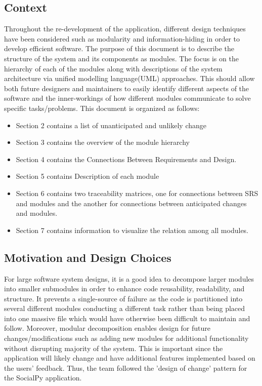 \documentclass[12pt, titlepage]{article}
\begin{document}
\subsection{Context}
Throughout the re-development of the application, different design techniques have been considered such as modularity and information-hiding in order to develop efficient software. The purpose of this document is to describe the structure of the system and its components as modules. The focus is on the hierarchy of each of the modules along with descriptions of the system architecture via unified modelling language(UML) approaches. This should allow both future designers and maintainers to easily identify different aspects of the software and the inner-workings of how different modules communicate to solve specific tasks/problems. This document is organized as follows:
\begin{itemize}
    \item Section 2 contains a list of unanticipated and unlikely change
    \item Section 3 contains the overview of the module hierarchy
    \item Section 4 contains the Connections Between Requirements and Design.
    \item Section 5 contains Description of each module
    \item Section 6 contains two traceability matrices, one for connections between SRS and modules and the another for connections between anticipated changes and modules.
    \item Section 7 contains information to visualize the relation among all modules.
\end{itemize}

\subsection{Motivation and Design Choices}
For large software system designs, it is a good idea to decompose larger modules into smaller submodules in order to enhance code reusability, readability, and structure. It prevents a single-source of failure as the code is partitioned into several different modules conducting a different task rather than being placed into one massive file which would have otherwise been difficult to maintain and follow. Moreover, modular decomposition enables design for future changes/modifications such as adding new modules for additional functionality without disrupting majority of the system. This is important since the application will likely change and have additional features implemented based on the users' feedback. Thus, the team followed the 'design of change' pattern for the SocialPy application.\\
\end{document}
